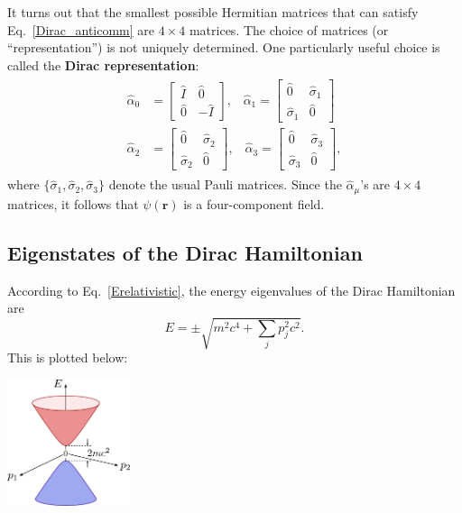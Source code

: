 \documentclass[prx,12pt]{revtex4-2}
\begin{document}
It turns out that the smallest possible Hermitian matrices that can
satisfy Eq.~\eqref{Dirac_anticomm} are $4\times4$ matrices.  The
choice of matrices (or ``representation'') is not uniquely determined.
One particularly useful choice is called the \textbf{Dirac
  representation}:
\begin{align}
  \begin{aligned}
    \hat{\alpha}_0 &= \begin{bmatrix}
      \hat{I}\, & \hat{0} \\ \hat{0} & -\hat{I}
    \end{bmatrix}, \;\;\;
    \hat{\alpha}_1 = \begin{bmatrix}
      \hat{0} & \hat{\sigma}_1 \\ \hat{\sigma}_1 & \hat{0}
    \end{bmatrix} \\
    \hat{\alpha}_2 &= \begin{bmatrix}
      \hat{0} & \hat{\sigma}_2 \\ \hat{\sigma}_2 & \hat{0}
    \end{bmatrix}, \;\;\;
    \hat{\alpha}_3 = \begin{bmatrix}
      \hat{0} & \hat{\sigma}_3 \\ \hat{\sigma}_3 & \hat{0}
    \end{bmatrix},
  \end{aligned}
  \label{alpha_matrices}
\end{align}
where $\{\hat{\sigma}_{1}, \hat{\sigma}_{2}, \hat{\sigma}_{3}\}$
denote the usual Pauli matrices.  Since the $\hat{\alpha}_\mu$'s are
$4\times4$ matrices, it follows that $\psi(\mathbf{r})$ is a
four-component field.

\subsection{Eigenstates of the Dirac Hamiltonian}
\label{sec:deigenstates}

According to Eq.~\eqref{Erelativistic}, the energy eigenvalues of the
Dirac Hamiltonian are
\begin{equation}
  E = \pm \sqrt{m^2c^4 + \sum_{j} p_j^2c^2}.
\end{equation}
This is plotted below:

\begin{center}
  \includegraphics[width=0.27\textwidth]{diraccone}
\end{center}
\end{document}
